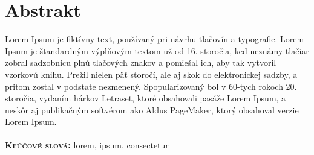 \chapter{Abstrakt}
Lorem Ipsum je fiktívny text, používaný pri návrhu tlačovín a typografie. Lorem Ipsum je štandardným výplňovým textom už od 16. storočia, keď neznámy tlačiar zobral sadzobnicu plnú tlačových znakov a pomiešal ich, aby tak vytvoril vzorkovú knihu. Prežil nielen päť storočí, ale aj skok do elektronickej sadzby, a pritom zostal v podstate nezmenený. Spopularizovaný bol v 60-tych rokoch 20. storočia, vydaním hárkov Letraset, ktoré obsahovali pasáže Lorem Ipsum, a neskôr aj publikačným softvérom ako Aldus PageMaker, ktorý obsahoval verzie Lorem Ipsum.\\ \\
\textbf{\textsc{Kľúčové slová:}} lorem, ipsum, consectetur
